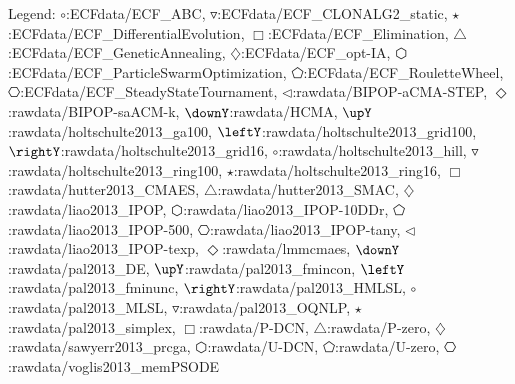 Legend: {\color{blue}$\circ$}:ECFdata/ECF\_ABC, {\color{red}$\triangledown$}:ECFdata/ECF\_CLONALG2\_static, {\color{cyan}$\star$}:ECFdata/ECF\_DifferentialEvolution, {\color{magenta}$\Box$}:ECFdata/ECF\_Elimination, {\color{black}$\triangle$}:ECFdata/ECF\_GeneticAnnealing, {\color{yellow}$\diamondsuit$}:ECFdata/ECF\_opt-IA, {\color{green!45!black}$\varhexagon$}:ECFdata/ECF\_ParticleSwarmOptimization, {\color{blue}$\pentagon$}:ECFdata/ECF\_RouletteWheel, {\color{red}$\hexagon$}:ECFdata/ECF\_SteadyStateTournament, {\color{cyan}$\triangleleft$}:rawdata/BIPOP-aCMA-STEP, {\color{magenta}$\Diamond$}:rawdata/BIPOP-saACM-k, {\color{black}$\downY$}:rawdata/HCMA, {\color{yellow}$\upY$}:rawdata/holtschulte2013\_ga100, {\color{green!45!black}$\leftY$}:rawdata/holtschulte2013\_grid100, {\color{green!45!black}$\rightY$}:rawdata/holtschulte2013\_grid16, {\color{blue}$\circ$}:rawdata/holtschulte2013\_hill, {\color{red}$\triangledown$}:rawdata/holtschulte2013\_ring100, {\color{cyan}$\star$}:rawdata/holtschulte2013\_ring16, {\color{magenta}$\Box$}:rawdata/hutter2013\_CMAES, {\color{black}$\triangle$}:rawdata/hutter2013\_SMAC, {\color{yellow}$\diamondsuit$}:rawdata/liao2013\_IPOP, {\color{green!45!black}$\varhexagon$}:rawdata/liao2013\_IPOP-10DDr, {\color{blue}$\pentagon$}:rawdata/liao2013\_IPOP-500, {\color{red}$\hexagon$}:rawdata/liao2013\_IPOP-tany, {\color{cyan}$\triangleleft$}:rawdata/liao2013\_IPOP-texp, {\color{magenta}$\Diamond$}:rawdata/lmmcmaes, {\color{black}$\downY$}:rawdata/pal2013\_DE, {\color{yellow}$\upY$}:rawdata/pal2013\_fmincon, {\color{green!45!black}$\leftY$}:rawdata/pal2013\_fminunc, {\color{green!45!black}$\rightY$}:rawdata/pal2013\_HMLSL, {\color{blue}$\circ$}:rawdata/pal2013\_MLSL, {\color{red}$\triangledown$}:rawdata/pal2013\_OQNLP, {\color{cyan}$\star$}:rawdata/pal2013\_simplex, {\color{magenta}$\Box$}:rawdata/P-DCN, {\color{black}$\triangle$}:rawdata/P-zero, {\color{yellow}$\diamondsuit$}:rawdata/sawyerr2013\_prcga, {\color{green!45!black}$\varhexagon$}:rawdata/U-DCN, {\color{blue}$\pentagon$}:rawdata/U-zero, {\color{red}$\hexagon$}:rawdata/voglis2013\_memPSODE